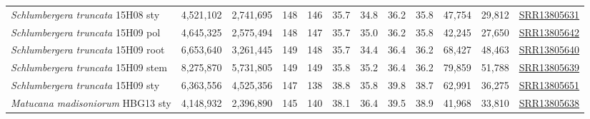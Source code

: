 \documentclass[fleqn,10pt,lineno]{wlpeerj}
\begin{document}
\begin{table}[ht]
{\begin{tabular}{l|cc|cc|cc|cc|cc|c}
\textit{Schlumbergera truncata} 15H08 sty   & 4,521,102 & 2,741,695 & 148 & 146 & 35.7 & 34.8 & 36.2 & 35.8 & 47,754 & 29,812 & \href{https://trace.ncbi.nlm.nih.gov/Traces/sra/?run=SRR13805631}{SRR13805631} \\
\textit{Schlumbergera truncata} 15H09 pol   & 4,645,325 & 2,575,494 & 148 & 147 & 35.7 & 35.0 & 36.2 & 35.8 & 42,245 & 27,650 & \href{https://trace.ncbi.nlm.nih.gov/Traces/sra/?run=SRR13805642}{SRR13805642} \\
\textit{Schlumbergera truncata} 15H09 root  & 6,653,640 & 3,261,445 & 149 & 148 & 35.7 & 34.4 & 36.4 & 36.2 & 68,427 & 48,463 & \href{https://trace.ncbi.nlm.nih.gov/Traces/sra/?run=SRR13805640}{SRR13805640} \\
\textit{Schlumbergera truncata} 15H09 stem  & 8,275,870 & 5,731,805 & 149 & 149 & 35.8 & 35.2 & 36.4 & 36.2 & 79,859 & 51,788 & \href{https://trace.ncbi.nlm.nih.gov/Traces/sra/?run=SRR13805639}{SRR13805639} \\
\textit{Schlumbergera truncata} 15H09 sty   & 6,363,556 & 4,525,356 & 147 & 138 & 38.8 & 35.8 & 39.8 & 38.7 & 62,991 & 36,275 & \href{https://trace.ncbi.nlm.nih.gov/Traces/sra/?run=SRR13805651}{SRR13805651} \\
\textit{Matucana madisoniorum} HBG13 sty    & 4,148,932 & 2,396,890 & 145 & 140 & 38.1 & 36.4 & 39.5 & 38.9 & 41,968 & 33,810 & \href{https://trace.ncbi.nlm.nih.gov/Traces/sra/?run=SRR13805638}{SRR13805638} \\
\bottomrule
\end{tabular}}
\end{table}
\end{document}
